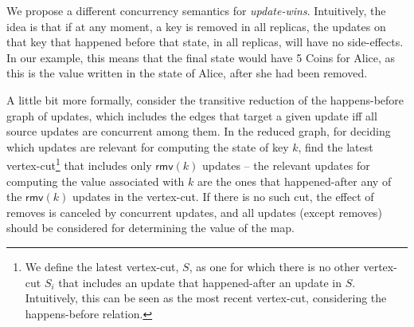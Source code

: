 \documentclass[11pt,a4paper]{article}
\begin{document}


We propose a different concurrency semantics for \emph{update-wins}.
Intuitively, the idea is that if at any moment, a key is removed in all replicas,
the updates on that key that happened before that state, in all replicas, will 
have no side-effects.
In our example, this means that the final state would have 5 Coins for Alice,
as this is the value written in the state of Alice, after she had been removed.

A little bit more formally, consider the transitive reduction of the 
happens-before graph of updates, which includes the edges that target 
a given update iff all source updates are concurrent among them.
In the reduced graph, for deciding which updates are relevant for computing the
state of key $k$, find the latest vertex-cut\footnote{We define the latest vertex-cut, $S$,
as one for which there is no other vertex-cut $S_i$ that includes an update that 
happened-after an update in $S$. Intuitively, this can be seen as the most recent vertex-cut,
considering the happens-before relation.} 
that includes only $\mathsf{rmv}(k)$ updates -- the relevant updates for computing the
value associated with $k$ are the ones that happened-after any of the 
$\mathsf{rmv}(k)$ updates in the vertex-cut. 
If there is no such cut, the effect of removes is canceled by concurrent updates, and
all updates (except removes) should be considered for determining the value of the map.
\end{document}
